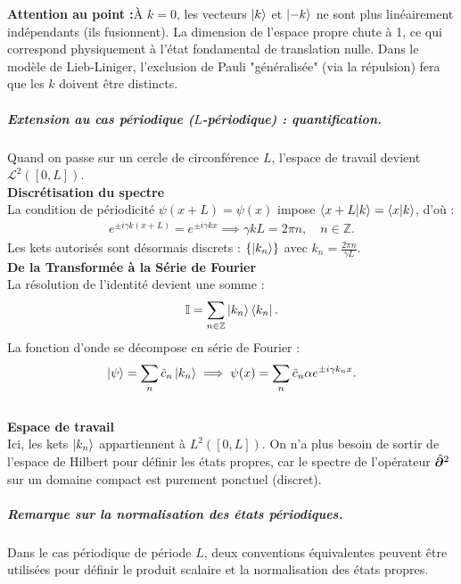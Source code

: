 {\bf Attention au point  :}À $k=0$, les vecteurs $\ket{k}$ et $\ket{-k}$ ne sont plus linéairement indépendants (ils fusionnent). La dimension de l'espace propre chute à 1, ce qui correspond physiquement à l'état fondamental de translation nulle. Dans le modèle de Lieb-Liniger, l'exclusion de Pauli "généralisée" (via la répulsion) fera que les $k$ doivent être distincts.

\subparagraph{Extension au cas périodique ($L$-périodique) : quantification. }
Quand on passe sur un cercle de circonférence $L$, l'espace de travail devient $\mathcal L^2([0, L])$.\\

{\bf Discrétisation du spectre}\\ 

La condition de périodicité $\psi(x+L) = \psi(x)$ impose $\braket{x+L | k} = \braket{x | k}$, d'où :
\begin{eqnarray}
    e^{\pm i \gamma k (x+L)} = e^{\pm i \gamma k x} \implies \gamma k L = 2\pi n, \quad n \in \mathbb{Z}.
\end{eqnarray}
Les kets autorisés sont désormais discrets : $\{ \ket{k_n} \}$ avec $k_n = \frac{2\pi n}{\gamma L}$.\\

{\bf De la Transformée à la Série de Fourier}\\

La résolution de l'identité devient une somme :
\begin{eqnarray}
    \mathbb{I} = \sum_{n \in \mathbb{Z}} \ket{k_n}\bra{k_n}.
\end{eqnarray}
La fonction d'onde se décompose en série de Fourier :
\begin{eqnarray}
   \ket{\psi} = \sum_n \tilde{c}_n \ket{k_n} \implies \psi(x) = \sum_n \tilde{c}_n \alpha e^{\pm i \gamma k_n x}.
\end{eqnarray}\\

{\bf Espace de travail}\\ 
Ici, les kets $\ket{k_n}$ appartiennent à $L^2([0, L])$. On n'a plus besoin de sortir de l'espace de Hilbert pour définir les états propres, car le spectre de l'opérateur $\hat{\bm{\partial}}^2$ sur un domaine compact est purement ponctuel (discret).

\subparagraph{Remarque sur la normalisation des états périodiques.}

Dans le cas périodique de période $L$, deux conventions équivalentes peuvent être
utilisées pour définir le produit scalaire et la normalisation des états propres.

